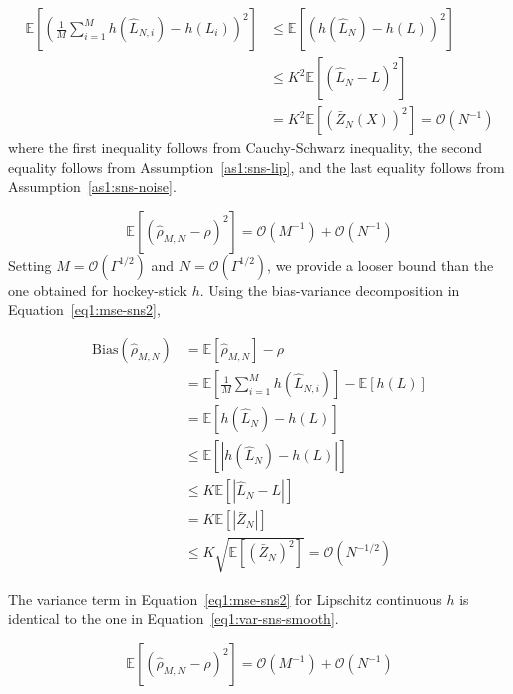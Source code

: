 \begin{align}
    \mathbb{E} \left[  \left( \frac{1}{M} \sum_{i=1}^M h\left( \hat{L}_{N, i} \right) -  h\left(L_i \right)  \right)^2\right]    
    & \leq \mathbb{E} \left[ \left( h\left( \hat{L}_N \right) -  h\left(L \right)  \right)^2\right]  \nonumber \\
    & \leq K^2 \mathbb{E} \left[ \left( \hat{L}_N -  L  \right)^2\right] \nonumber \\
    & = K^2 \mathbb{E} \left[ \left( \bar{Z}_{N}(X) \right)^2\right] = \mathcal{O}(N^{-1})
\end{align}
where the first inequality follows from Cauchy-Schwarz inequality, the second equality follows from Assumption~\ref{as1:sns-lip}, and the last equality follows from Assumption~\ref{as1:sns-noise}.

\begin{equation}
    \mathbb{E} \left[ \left( \hat{\rho}_{M, N} - \rho \right)^2 \right] = \mathcal{O}(M^{-1}) + \mathcal{O}(N^{-1})
\end{equation}
Setting $M = \mathcal{O}(\Gamma^{1/2})$ and $N = \mathcal{O}(\Gamma^{1/2})$, we provide a looser bound than the one obtained for hockey-stick $h$.
Using the bias-variance decomposition in Equation~\ref{eq1:mse-sns2}, 

\begin{align} \label{eq1:bias-sns-lip}
    \text{Bias}(\hat{\rho}_{M, N})
    & = \mathbb{E} \left[ \hat{\rho}_{M, N} \right] - \rho \nonumber \\
    & = \mathbb{E} \left[ \frac{1}{M} \sum_{i=1}^M h\left( \hat{L}_{N, i} \right) \right] - \mathbb{E} \left[ h\left(L \right) \right]  \nonumber \\
    & = \mathbb{E} \left[ h\left( \hat{L}_N \right) - h\left( L \right) \right] \nonumber \\
    & \leq \mathbb{E} \left[ |h\left( \hat{L}_N \right) - h\left( L \right) | \right] \nonumber \\
    & \leq K \mathbb{E} \left[ |\hat{L}_N - L| \right] \nonumber \\
    & = K \mathbb{E} \left[ |\bar{Z}_N| \right] \nonumber \\
    & \leq K \sqrt{\mathbb{E} \left[ \left( \bar{Z}_N \right)^2 \right]} = \mathcal{O}(N^{-1/2})
\end{align}

The variance term in Equation~\ref{eq1:mse-sns2} for Lipschitz continuous $h$ is identical to the one in Equation~\ref{eq1:var-sns-smooth}.

\begin{equation}
    \mathbb{E} \left[ \left( \hat{\rho}_{M, N} - \rho \right)^2 \right] = \mathcal{O}(M^{-1}) + \mathcal{O}(N^{-1})
\end{equation}

